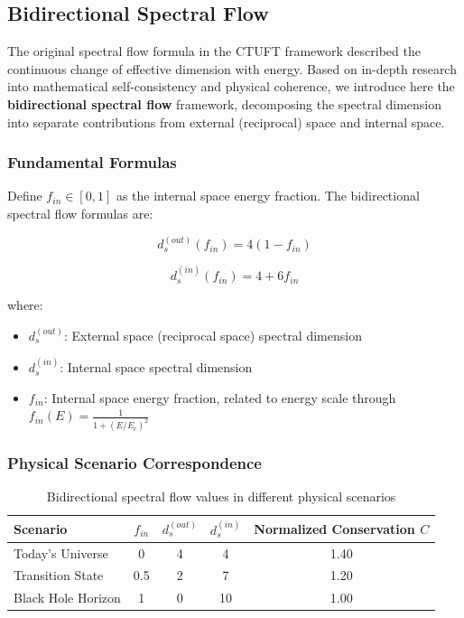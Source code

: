 
\subsection{Bidirectional Spectral Flow}
\label{sec:bidirectional_spectral_flow}

The original spectral flow formula in the CTUFT framework described the continuous change of effective dimension with energy. Based on in-depth research into mathematical self-consistency and physical coherence, we introduce here the \textbf{bidirectional spectral flow} framework, decomposing the spectral dimension into separate contributions from external (reciprocal) space and internal space.

\subsubsection{Fundamental Formulas}

Define $f_{in} \in [0,1]$ as the internal space energy fraction. The bidirectional spectral flow formulas are:

\begin{equation}
\boxed{d_s^{(out)}(f_{in}) = 4(1 - f_{in})}
\label{eq:spectral_out}
\end{equation}

\begin{equation}
\boxed{d_s^{(in)}(f_{in}) = 4 + 6f_{in}}
\label{eq:spectral_in}
\end{equation}

where:
\begin{itemize}
    \item $d_s^{(out)}$: External space (reciprocal space) spectral dimension
    \item $d_s^{(in)}$: Internal space spectral dimension  
    \item $f_{in}$: Internal space energy fraction, related to energy scale through $f_{in}(E) = \frac{1}{1+(E/E_c)^2}$
\end{itemize}

\subsubsection{Physical Scenario Correspondence}

\begin{table}[h]
\centering
\begin{tabular}{lcccc}
\hline
\textbf{Scenario} & $f_{in}$ & $d_s^{(out)}$ & $d_s^{(in)}$ & \textbf{Normalized Conservation} $C$ \\
\hline
Today's Universe & 0 & 4 & 4 & 1.40 \\
Transition State & 0.5 & 2 & 7 & 1.20 \\
Black Hole Horizon & 1 & 0 & 10 & 1.00 \\
\hline
\end{tabular}
\caption{Bidirectional spectral flow values in different physical scenarios}
\label{tab:spectral_scenarios}
\end{table}

